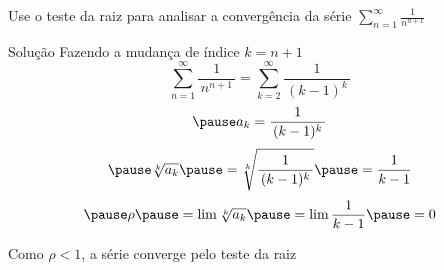 \begin{question}
  Use o teste da raiz para analisar a convergência da série
  \(
    \sum_{n=1}^\infty\frac{1}{n^{n+1}}
  \)
\end{question}

\begin{resolution}{Solução}
  Fazendo a mudança de índice \(k=n+1\)
  \[
    \sum_{n=1}^\infty\frac{1}{\, n^{n+1}\,} =
    \sum_{k=2}^\infty\frac{1}{\,(k-1)^{k}\,}
  \]
  \[
    \pause
    a_k = \frac{1}{\,(k-1)^{k}\,}
  \]
  \[
    \pause
    \sqrt[k]{a_k}
    \pause
    = \sqrt[k]{\frac{1}{\,(k-1)^{k}\,}}
    \pause
    = \frac{1}{k-1}
  \]
  \[
    \pause
    \rho
    \pause
    = \lim \sqrt[k]{a_k}
    \pause
    = \lim \frac{1}{k-1}
    \pause
    = 0
  \]

  Como \(\rho < 1\),
  \pause
  a série converge pelo teste da raiz
\end{resolution}

